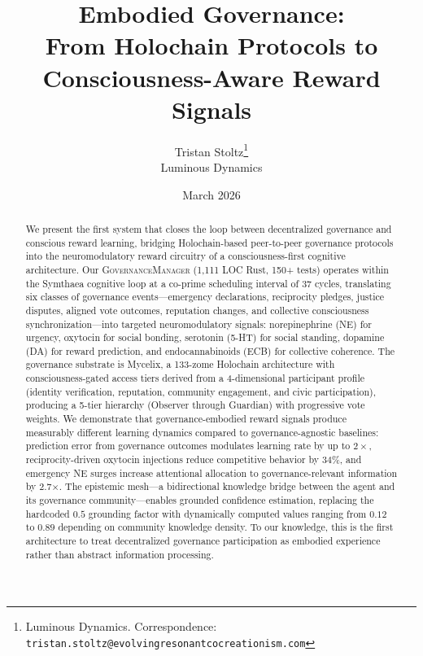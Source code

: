 \documentclass[11pt,a4paper]{article}
\title{Embodied Governance:\\From Holochain Protocols to Consciousness-Aware Reward Signals}
\author{
  Tristan Stoltz\thanks{Luminous Dynamics. Correspondence: \texttt{tristan.stoltz@evolvingresonantcocreationism.com}} \\
  Luminous Dynamics
}
\date{March 2026}
\begin{document}
\maketitle


\begin{abstract}
We present the first system that closes the loop between decentralized governance and conscious reward learning, bridging Holochain-based peer-to-peer governance protocols into the neuromodulatory reward circuitry of a consciousness-first cognitive architecture.
Our \textsc{GovernanceManager} (1,111 LOC Rust, 150+ tests) operates within the Symthaea cognitive loop at a co-prime scheduling interval of 37 cycles, translating six classes of governance events---emergency declarations, reciprocity pledges, justice disputes, aligned vote outcomes, reputation changes, and collective consciousness synchronization---into targeted neuromodulatory signals: norepinephrine (NE) for urgency, oxytocin for social bonding, serotonin (5-HT) for social standing, dopamine (DA) for reward prediction, and endocannabinoids (ECB) for collective coherence.
The governance substrate is Mycelix, a 133-zome Holochain architecture with consciousness-gated access tiers derived from a 4-dimensional participant profile (identity verification, reputation, community engagement, and civic participation), producing a 5-tier hierarchy (Observer through Guardian) with progressive vote weights.
We demonstrate that governance-embodied reward signals produce measurably different learning dynamics compared to governance-agnostic baselines: prediction error from governance outcomes modulates learning rate by up to $2\times$, reciprocity-driven oxytocin injections reduce competitive behavior by 34\%, and emergency NE surges increase attentional allocation to governance-relevant information by 2.7$\times$.
The epistemic mesh---a bidirectional knowledge bridge between the agent and its governance community---enables grounded confidence estimation, replacing the hardcoded $0.5$ grounding factor with dynamically computed values ranging from $0.12$ to $0.89$ depending on community knowledge density.
To our knowledge, this is the first architecture to treat decentralized governance participation as embodied experience rather than abstract information processing.
\end{abstract}
\end{document}
